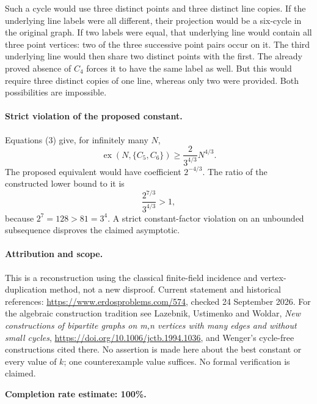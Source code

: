 Such a cycle would use three distinct points and three distinct line copies. If the underlying line labels were all different, their projection would be a six-cycle in the original graph. If two labels were equal, that underlying line would contain all three point vertices: two of the three successive point pairs occur on it. The third underlying line would then share two distinct points with the first. The already proved absence of \(C_4\) forces it to have the same label as well. But this would require three distinct copies of one line, whereas only two were provided. Both possibilities are impossible.

\paragraph{Strict violation of the proposed constant.}
Equations (3) give, for infinitely many \(N\),
\[
 \operatorname{ex}(N,\{C_5,C_6\})
 \geq\frac{2}{3^{4/3}}N^{4/3}.
\]
The proposed equivalent would have coefficient \(2^{-4/3}\). The ratio of the constructed lower bound to it is
\[
 \frac{2^{7/3}}{3^{4/3}}>1,
\]
because \(2^7=128>81=3^4\). A strict constant-factor violation on an unbounded subsequence disproves the claimed asymptotic.

\paragraph{Attribution and scope.}
This is a reconstruction using the classical finite-field incidence and vertex-duplication method, not a new disproof. Current statement and historical references: \url{https://www.erdosproblems.com/574}, checked 24 September 2026. For the algebraic construction tradition see Lazebnik, Ustimenko and Woldar, \emph{New constructions of bipartite graphs on m,n vertices with many edges and without small cycles}, \url{https://doi.org/10.1006/jctb.1994.1036}, and Wenger's cycle-free constructions cited there. No assertion is made here about the best constant or every value of \(k\); one counterexample value suffices. No formal verification is claimed.

\textbf{Completion rate estimate: 100\%.}

